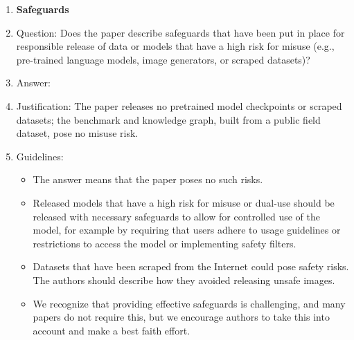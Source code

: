 \begin{enumerate}
\item {\bf Safeguards}
    \item[] Question: Does the paper describe safeguards that have been put in place for responsible release of data or models that have a high risk for misuse (e.g., pre-trained language models, image generators, or scraped datasets)?
    \item[] Answer: \answerNA{}
    \item[] Justification: The paper releases no pretrained model checkpoints or scraped datasets; the benchmark and knowledge graph, built from a public field dataset, pose no misuse risk.
    \item[] Guidelines:
    \begin{itemize}
        \item The answer \answerNA{} means that the paper poses no such risks.
        \item Released models that have a high risk for misuse or dual-use should be released with necessary safeguards to allow for controlled use of the model, for example by requiring that users adhere to usage guidelines or restrictions to access the model or implementing safety filters. 
        \item Datasets that have been scraped from the Internet could pose safety risks. The authors should describe how they avoided releasing unsafe images.
        \item We recognize that providing effective safeguards is challenging, and many papers do not require this, but we encourage authors to take this into account and make a best faith effort.
    \end{itemize}


\end{enumerate}
